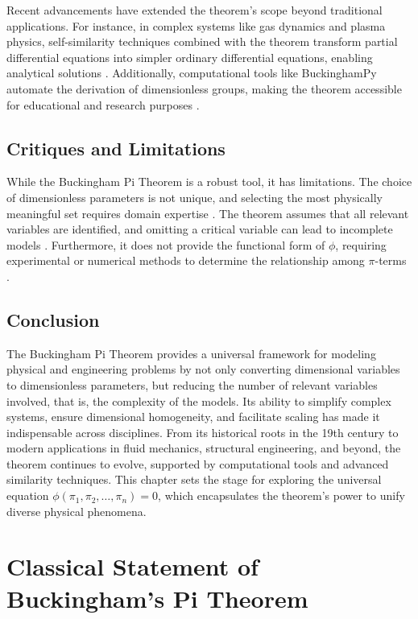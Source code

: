\documentclass[
	11pt, %
	fleqn, %
	a4paper, %
]{LegrandOrangeBook}
\begin{document}
Recent advancements have extended the theorem's scope beyond traditional applications. For instance, in complex systems like gas dynamics and plasma physics, self-similarity techniques combined with the theorem transform partial differential equations into simpler ordinary differential equations, enabling analytical solutions \cite{ResearchGate2024}. Additionally, computational tools like BuckinghamPy automate the derivation of dimensionless groups, making the theorem accessible for educational and research purposes \cite{BuckinghamPy2021}.

\subsection{Critiques and Limitations}

While the Buckingham Pi Theorem is a robust tool, it has limitations. The choice of dimensionless parameters is not unique, and selecting the most physically meaningful set requires domain expertise \cite{WikipediaBuckingham}. The theorem assumes that all relevant variables are identified, and omitting a critical variable can lead to incomplete models \cite{RedditAskScience2017}. Furthermore, it does not provide the functional form of \(\phi\), requiring experimental or numerical methods to determine the relationship among \(\pi\)-terms \cite{StudySmarter2023}.

\subsection{Conclusion}

The Buckingham Pi Theorem provides a universal framework for modeling physical and engineering problems by not only converting dimensional variables to dimensionless parameters, but reducing the number of relevant variables involved, that is, the complexity of the models. Its ability to simplify complex systems, ensure dimensional homogeneity, and facilitate scaling has made it indispensable across disciplines. From its historical roots in the 19th century to modern applications in fluid mechanics, structural engineering, and beyond, the theorem continues to evolve, supported by computational tools and advanced similarity techniques. This chapter sets the stage for exploring the universal equation \(\phi(\pi_1, \pi_2, \dots, \pi_n) = 0\), which encapsulates the theorem's power to unify diverse physical phenomena.


\section{Classical Statement of Buckingham's Pi Theorem}
\end{document}
